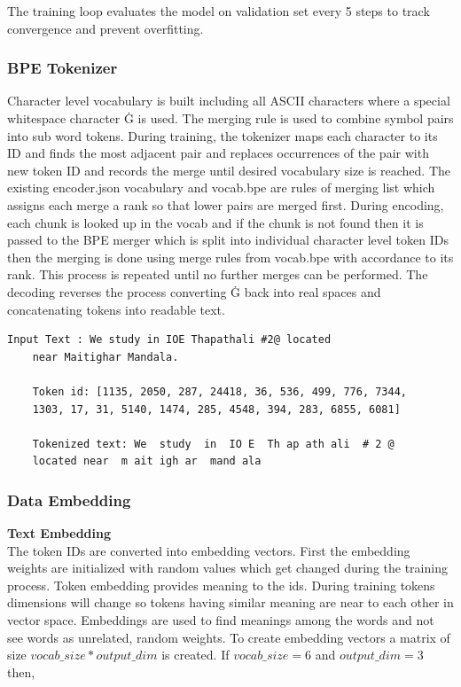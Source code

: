 The training loop evaluates the model on validation set every 5 steps to track convergence and prevent overfitting.

\subsubsection{BPE Tokenizer}
Character level vocabulary is built including all ASCII characters where a special whitespace character Ġ is used. The merging rule is used to combine symbol pairs into sub word tokens. During training, the tokenizer maps each character to its ID and finds the most adjacent pair and replaces occurrences of the pair with new token ID and records the merge until desired vocabulary size is reached. The existing encoder.json vocabulary and vocab.bpe are rules of merging list which assigns each merge a rank so that lower pairs are merged first. During encoding, each chunk is looked up in the vocab and if the chunk is not found then it is passed to the  BPE merger which is split into individual character level token IDs then the merging is done using merge rules from vocab.bpe with accordance to its rank. This process is repeated until no further merges can be performed. The decoding reverses the process converting Ġ back into real spaces and concatenating tokens into readable text.  

\begin{lstlisting}[basicstyle=\footnotesize\ttfamily,caption = Output of BPE Tokenizer on a sample text]
    Input Text : We study in IOE Thapathali #2@ located 
    near Maitighar Mandala.

    Token id: [1135, 2050, 287, 24418, 36, 536, 499, 776, 7344, 
    1303, 17, 31, 5140, 1474, 285, 4548, 394, 283, 6855, 6081]

    Tokenized text: We  study  in  IO E  Th ap ath ali  # 2 @ 
    located near  m ait igh ar  mand ala
\end{lstlisting}

\subsubsection{Data Embedding}
\textbf{Text Embedding}\\
The token IDs are converted into embedding vectors. First the embedding weights are initialized with random values which get changed during the training process. Token embedding provides meaning to the ids. During training tokens dimensions will change so tokens having similar meaning are near to each other in vector space. Embeddings are used to find meanings among the words and not see words as unrelated, random weights. To create embedding vectors a matrix of size $vocab\_size * output\_dim$ is created. If $vocab\_size = 6$ and $output\_dim = 3$ then,


